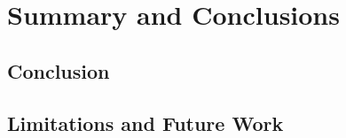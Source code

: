 \chapter{Summary and Conclusions}\label{conclusions}

\section{Conclusion}

\section{Limitations and Future Work}



